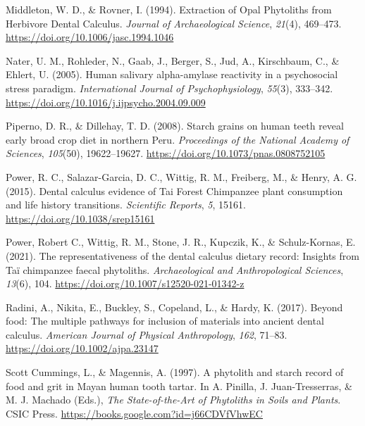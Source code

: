 \documentclass[
  letterpaper,
]{book}
\newlength{\cslhangindent}
\newlength{\cslentryspacingunit} %
\newenvironment{CSLReferences}[2] %
 {%
  \setlength{\parindent}{0pt}
  \ifodd #1
  \let\oldpar\par
  \def\par{\hangindent=\cslhangindent\oldpar}
  \fi
  \setlength{\parskip}{#2\cslentryspacingunit}
 }%
 {}
\begin{document}
\begin{CSLReferences}{1}{0}
\leavevmode{}%
Middleton, W. D., \& Rovner, I. (1994). Extraction of {Opal Phytoliths}
from {Herbivore Dental Calculus}. \emph{Journal of Archaeological
Science}, \emph{21}(4), 469--473.
\url{https://doi.org/10.1006/jasc.1994.1046}

\leavevmode{}%
Nater, U. M., Rohleder, N., Gaab, J., Berger, S., Jud, A., Kirschbaum,
C., \& Ehlert, U. (2005). Human salivary alpha-amylase reactivity in a
psychosocial stress paradigm. \emph{International Journal of
Psychophysiology}, \emph{55}(3), 333--342.
\url{https://doi.org/10.1016/j.ijpsycho.2004.09.009}

\leavevmode{}%
Piperno, D. R., \& Dillehay, T. D. (2008). Starch grains on human teeth
reveal early broad crop diet in northern {Peru}. \emph{Proceedings of
the National Academy of Sciences}, \emph{105}(50), 19622--19627.
\url{https://doi.org/10.1073/pnas.0808752105}

\leavevmode{}%
Power, R. C., Salazar-Garcia, D. C., Wittig, R. M., Freiberg, M., \&
Henry, A. G. (2015). Dental calculus evidence of {Tai Forest Chimpanzee}
plant consumption and life history transitions. \emph{Scientific
Reports}, \emph{5}, 15161. \url{https://doi.org/10.1038/srep15161}

\leavevmode{}%
Power, Robert C., Wittig, R. M., Stone, J. R., Kupczik, K., \&
Schulz-Kornas, E. (2021). The representativeness of the dental calculus
dietary record: Insights from {Taï} chimpanzee faecal phytoliths.
\emph{Archaeological and Anthropological Sciences}, \emph{13}(6), 104.
\url{https://doi.org/10.1007/s12520-021-01342-z}

\leavevmode{}%
Radini, A., Nikita, E., Buckley, S., Copeland, L., \& Hardy, K. (2017).
Beyond food: {The} multiple pathways for inclusion of materials into
ancient dental calculus. \emph{American Journal of Physical
Anthropology}, \emph{162}, 71--83.
\url{https://doi.org/10.1002/ajpa.23147}

\leavevmode{}%
Scott Cummings, L., \& Magennis, A. (1997). A phytolith and starch
record of food and grit in {Mayan} human tooth tartar. In A. Pinilla, J.
Juan-Tresserras, \& M. J. Machado (Eds.), \emph{The {State-of-the-Art}
of {Phytoliths} in {Soils} and {Plants}}. {CSIC Press}.
\url{https://books.google.com?id=j66CDVfVhwEC}


\end{CSLReferences}
\end{document}
